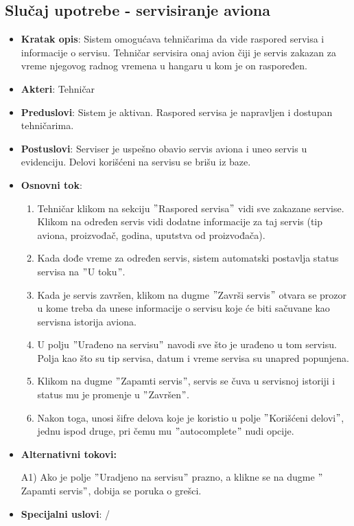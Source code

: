 \documentclass[a4paper]{article}
\begin{document}
\subsection{Slučaj upotrebe - servisiranje aviona}
\label{subsec:servisiranje_aviona}
\begin{itemize}
    \item \textbf{Kratak opis}: Sistem omogućava tehničarima da vide raspored servisa i informacije o servisu. Tehničar servisira onaj avion čiji je servis zakazan za vreme njegovog radnog vremena u hangaru u kom je on raspoređen.
    \item \textbf{Akteri}: Tehničar
    \item \textbf{Preduslovi}: Sistem je aktivan. Raspored servisa je napravljen i dostupan tehničarima.
    \item \textbf{Postuslovi}: Serviser je uspešno obavio servis aviona i uneo servis u evidenciju. Delovi korišćeni na servisu se brišu iz baze.
    \item \textbf{Osnovni tok}:
        \begin{enumerate}
            \item Tehničar klikom na sekciju $"$Raspored servisa$"$ vidi sve zakazane servise. Klikom na određen servis vidi dodatne informacije za taj servis (tip aviona, proizvođač, godina, uputstva od proizvođača).
            \item Kada dođe vreme za određen servis, sistem automatski postavlja status servisa na $"$U toku$"$.
            \item Kada je servis završen, klikom na dugme $"$Završi servis$"$ otvara se prozor u kome treba da unese informacije o servisu koje će biti sačuvane kao servisna istorija aviona.
            \item U polju $"$Urađeno na servisu$"$ navodi sve što je urađeno u tom servisu. Polja kao što su tip servisa, datum i vreme servisa su unapred popunjena.
            \item Klikom na dugme $"$Zapamti servis$"$, servis se čuva u servisnoj istoriji i status mu je promenje u $"$Završen$"$.
            \item Nakon toga, unosi šifre delova koje je koristio u polje $"$Korišćeni delovi$"$, jednu ispod druge, pri čemu mu $"$autocomplete$"$ nudi opcije.
        \end{enumerate}
    \item \textbf{Alternativni tokovi:}
        \begin{enumerate}
            A1) Ako je polje $"$Uradjeno na servisu$"$ prazno, a klikne se na dugme $"$Zapamti servis$"$, dobija se poruka o grešci.
        \end{enumerate}
    \item \textbf{Specijalni uslovi}: /
\end{itemize}
\end{document}
